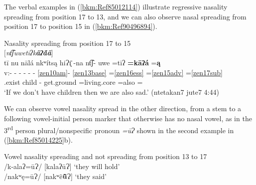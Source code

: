 \documentclass[output=paper]{langscibook}
\begin{document}
The verbal examples in (\ref{bkm:Ref85012114}) illustrate regressive nasality spreading from position 17 to 13, and we can also observe nasal spreading from position 17 to position 15 in (\ref{bkm:Ref90496894}).  


\ea\label{bkm:Ref90496894}Nasality spreading from position 17 to 15\\
$[$\textit{nt͡ʃuwetīʔk\textbf{ãʔã́ã}}$]$ \\ 
\glll tī nu nālá nkʷítsą hiɁ\={\k{ı}} -na nt͡ʃ- uwe =tīʔ \textbf{=kāʔá} =\textbf{ą}\\
v:- - - - - - \ref{zen10am}{}- \ref{zen13base} =\ref{zen16ess} =\ref{zen15adv} =\ref{zen17sub} \\
\Cond{} \Sub{} \Neg{}.exist child \Gen{} \First\Incl{} \Prog{}- get.ground =living.core =also =\First\Incl{}\\
\glt `If we don't have children then we are also sad.' (ntetakan7 jute7 4:44) 
\z

We can observe vowel nasality spread in the other direction, from a stem to a following vowel-initial person marker that otherwise has no nasal vowel, as in the 3\textsuperscript{rd} person plural/nonspecific pronoun \textit{=ūɁ} shown in the second example in (\ref{bkm:Ref85014225}b).


\ea\label{bkm:Ref85014225}Vowel nasality spreading and not spreading from position 13 to 17\\
    \ea /k-alaʔ=ūɁ/ \hspace{1cm} [kalaʔūɁ] \hspace{1cm} `they will hold'\\
    \ex /nakʷę=ūɁ/ \hspace{1cm} [nakʷẽ\textbf{ũ̄}Ɂ] \hspace{1cm} `they said' \\
    \z
\z 


\end{document}
